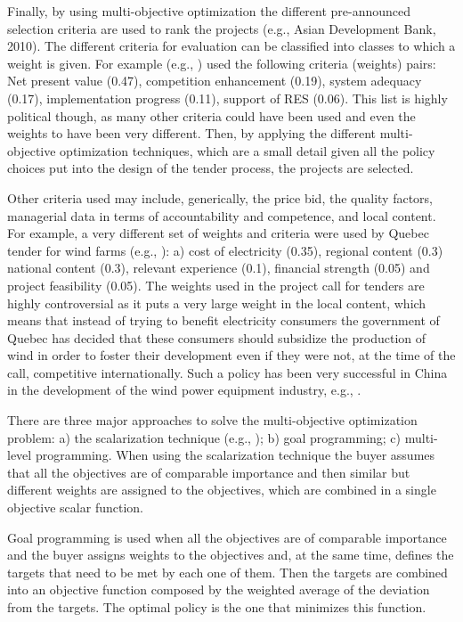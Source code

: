 \documentclass[informs]{informs3}
\begin{document}
Finally, by using multi-objective optimization the different pre-announced selection criteria are used to rank the projects  (e.g., Asian Development Bank, 2010). The different criteria for evaluation can be classified into classes to which a weight is given. For example (e.g., \citealp{KEMA_et_al_2013}) used the following criteria (weights) pairs: Net present value (0.47), competition enhancement (0.19), system adequacy (0.17), implementation progress (0.11), support of RES (0.06). This list is highly political though, as many other criteria could have been used and even the weights to have been very different. Then, by applying the different multi-objective optimization techniques, which are a small detail given all the policy choices put into the design of the tender process, the projects are selected. 


Other criteria used may include, generically, the price bid, the quality factors, managerial data in terms of accountability and competence, and local content. For example, a very different set of weights and criteria were used by Quebec tender for wind farms (e.g., \citealp{Merrimack_2005}):  a) cost of electricity (0.35), regional content (0.3) national content (0.3), relevant experience (0.1), financial strength (0.05) and project feasibility (0.05). The weights used in the project call for tenders are highly controversial as it puts a very large weight in the local content, which means that instead of trying to benefit electricity consumers the government of Quebec has decided that these consumers should subsidize the production of wind in order to foster their development even if they were not, at the time of the call, competitive internationally. Such a policy has been very successful in China in the development of the wind power equipment industry, e.g., . 

There are three major approaches to solve the multi-objective optimization problem: a) the scalarization technique (e.g., \citealp{Liu_et_al_2000}); b) goal programming; c) multi-level programming. When using the scalarization technique the buyer assumes that all the objectives are of comparable importance and then similar but different weights are assigned to the objectives, which are combined in a single objective scalar function. 

Goal programming is used when all the objectives are of comparable importance and the buyer assigns weights to the objectives and, at the same time, defines the targets that need to be met by each one of them. Then the targets are combined into an objective function composed by the weighted average of the deviation from the targets. The optimal policy is the one that minimizes this function.
\end{document}
